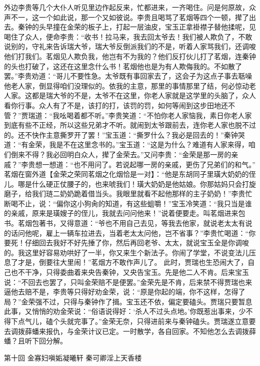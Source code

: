 \documentclass[12pt,oneside]{book}
\begin{document}
外边李贵等几个大仆人听见里边作起反来，忙都进来，一齐喝住。问是何原故，众声不一，这一个如此说，那一个又如彼说。李贵且喝骂了茗烟等四个一顿，撵了出去。秦钟的头早撞在金荣的板子上，打起一层油皮，宝玉正拿褂襟子替他揉呢，见喝住了众人，便命李贵：“收书！拉马来，我去回太爷去！我们被人欺负了，不敢说别的，守礼来告诉瑞大爷，瑞大爷反倒派我们的不是，听着人家骂我们，还调唆他们打我们。茗烟见人欺负我，他岂有不为我的？他们反打伙儿打了茗烟，连秦钟的头也打破了，这还在这里念什么书！茗烟他也是为有人欺侮我的。不如散了罢。”李贵劝道：“哥儿不要性急。太爷既有事回家去了，这会子为这点子事去聒噪他老人家，倒显得咱们没理似的。依我的主意，那里的事情那里了结，何必惊动老人家。这都是瑞大爷的不是，太爷不在这里，你老人家就是这学里的头脑了，众人看你行事。众人有了不是，该打的打，该罚的罚，如何等闹到这步田地还不管？”贾瑞道：“我吆喝着都不听。”李贵笑道：“不怕你老人家恼我，素日你老人家到底有些不正经，所以这些兄弟才不听。就闹到太爷跟前去，连你老人家也脱不过的。还不快作主意撕罗开了罢！”宝玉道：“撕罗什么？我必是回去的！”秦钟哭道：“有金荣，我是不在这里念书的。”宝玉道：“这是为什么？难道有人家来得，咱们倒来不得？我必回明白众人，撵了金荣去。”又问李贵：“金荣是那一房的亲戚？”李贵想一想道：“也不用问了。若说起哪一房的亲戚，更伤了兄弟们的和气。”
茗烟在窗外道【金荣之荣同茗烟之化烟恰是一对】：“他是东胡同子里璜大奶奶的侄儿。哪是什么硬正仗腰子的，也来唬我们！璜大奶奶是他姑娘。你那姑妈只会打旋磨子，给我们琏二奶奶跪着借当头。我眼里就看不起他那样的主子奶奶！”李贵忙断喝不止，说：“偏你这小狗肏的知道，有这些蛆嚼！”宝玉冷笑道：“我只当是谁的亲戚，原来是璜嫂子的侄儿，我就去问问他来！”说着便要走。叫茗烟进来包书。茗烟包著书，又得意道：“爷也不用自己去见，等我去他家，就说老太太有说的话问他呢，雇上一辆车拉进去，当着老太太问他，岂不省事？”李贵忙喝道：“你要死！仔细回去我好不好先捶了你，然后再回老爷、太太，就说宝玉全是你调唆的。我这里好容易劝哄好了一半，你又来生个新法子。你闹了学堂，不说变法儿压息了才是，倒要往大里闹！”茗烟方不敢作声儿了。
此时，贾瑞也生恐闹大了，自己也不干净，只得委曲着来央告秦钟，又央告宝玉。先是他二人不肯。后来宝玉说：“不回去也罢了，只叫金荣赔不是便罢。”金荣先是不肯，后来禁不得贾瑞也来逼他去赔不是，李贵等只得好劝金荣，说：“原是你起的端，你不这样，怎得了局？”金荣强不过，只得与秦钟作了揖。宝玉还不依，偏定要磕头。贾瑞只要暂息此事，又悄悄的劝金荣说：“俗语说得好：‘杀人不过头点地。’你既惹出事来，少不得下点气儿，磕个头就完事了。”金荣无奈，只得进前来与秦钟磕头。贾瑞遂立意要去调拨薛蟠来报仇，与金荣计议已定。一时散学，各自回家。不知他怎么去调拨薛蟠？且听下回分解。


 
第十回 金寡妇嗔姤凝曦轩 秦可卿淫上天香楼
\end{document}
